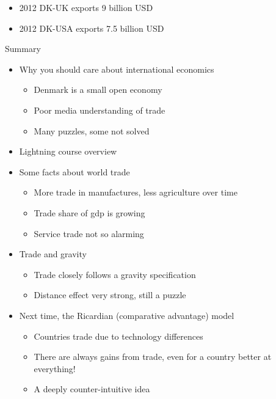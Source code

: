 \documentclass[ignorenonframetext,]{beamer}
\begin{document}
\begin{frame}

    \begin{itemize}
        \item 2012 DK-UK exports 9 billion USD
        \item 2012 DK-USA exports 7.5 billion USD
    \end{itemize}

\end{frame}

\begin{frame}{Summary}

  \begin{itemize}
  \itemsep1pt\parskip0pt
  \item Why you should care about international economics
        \begin{itemize}
            \item Denmark is a small open economy
            \item Poor media understanding of trade 
            \item Many puzzles, some not solved 
        \end{itemize}
  \item Lightning course overview
  \item Some facts about world trade
        \begin{itemize}
            \item More trade in manufactures, less agriculture over time 
            \item Trade share of gdp is growing 
            \item Service trade not so alarming 
        \end{itemize}
  \item Trade and gravity
        \begin{itemize}
            \item Trade closely follows a gravity specification
            \item Distance effect very strong, still a puzzle
        \end{itemize}
  \end{itemize}

\end{frame}

\begin{frame}

    \begin{itemize}
        \item Next time, the Ricardian (comparative advantage) model
        \begin{itemize}
            \item Countries trade due to technology differences
            \item There are always gains from trade, even for a country better at everything!
            \item A deeply counter-intuitive idea
        \end{itemize}
    \end{itemize}

\end{frame}
\end{document}
